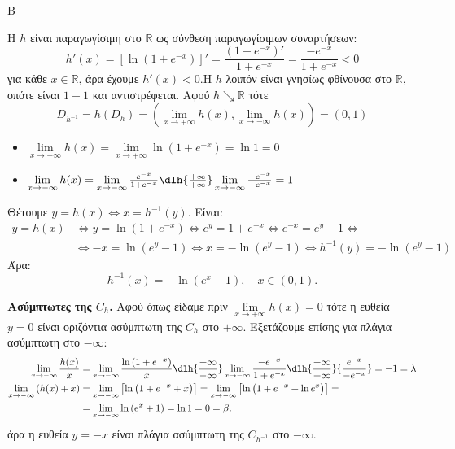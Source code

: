 \begin{thema}{Β}
\begin{erwthma}[resume]
\item Η $h$ είναι παραγωγίσιμη στο $\mathbb{R}$ ως σύνθεση παραγωγίσιμων συναρτήσεων:
\[
h'(x)=\left[\ln\left(1+e^{-x}\right)\right]'=\frac{\left(1+e^{-x}\right)'}{1+e^{-x}}=\frac{-e^{-x}}{1+e^{-x}}<0
\]
για κάθε $x\in\mathbb{R}$, άρα έχουμε $h'(x)<0$.Η $h$ λοιπόν είναι γνησίως φθίνουσα στο $\mathbb{R}$, οπότε είναι $1-1$ και αντιστρέφεται. Αφού $h\searrow\mathbb{R}$ τότε
\[D_{h^{-1}}=h(D_h)=\left(\lim\limits_{x\to+\infty}{h(x)},\lim\limits_{x\to -\infty}{h(x)}\right)=(0,1)\]
\begin{itemize}
\item $\lim\limits_{x\to+\infty}{h(x)}=\lim\limits_{x\to +\infty}{\ln\left(1+e^{-x}\right)}=\ln{1}=0$
\item $\lim\limits_{x\to -\infty}{h(x)}=\lim\limits_{x\to-\infty}{\frac{e^{-x}}{1+e^{-x}}}\dlh{\frac{+\infty}{+\infty}}\lim\limits_{x\to-\infty}{\frac{-e^{-x}}{-e^{-x}}}=1$
\end{itemize}
Θέτουμε $y=h(x)\Leftrightarrow x=h^{-1}(y)$. Είναι:
\begin{align*}
y=h(x)&\Leftrightarrow y=\ln\left(1+e^{-x}\right)\Leftrightarrow e^y=1+e^{-x}\Leftrightarrow e^{-x}=e^y-1\Leftrightarrow\\&\Leftrightarrow -x=\ln(e^y-1)\Leftrightarrow x=-\ln(e^y-1)\Leftrightarrow h^{-1}(y)=-\ln(e^y-1)
\end{align*}
Άρα:
\[
h^{-1}(x)=-\ln(e^x-1),\quad x\in(0,1).
\]

\item \textbf{Ασύμπτωτες της $C_{h}$.}
Αφού όπως είδαμε πριν $\lim\limits_{x\to +\infty}{h(x)}=0$ τότε η ευθεία $y=0$ είναι οριζόντια ασύμπτωτη της $C_h$ στο $+\infty$. Εξετάζουμε επίσης για πλάγια ασύμπτωτη στο $-\infty$:
\begin{align*}
\lim\limits_{x\to -\infty}{\frac{h(x)}{x}}&=\lim\limits_{x\to -\infty}{\frac{\ln\left(1+e^{-x}\right)}{x}}\dlh{\frac{+\infty}{-\infty}}\lim\limits_{x\to -\infty}{\frac{-e^{-x}}{1+e^{-x}}}\dlh{\frac{+\infty}{+\infty}}{\frac{e^{-x}}{-e^{-x}}}=-1=\lambda\\
\lim\limits_{x\to -\infty}{\left(h(x)+x\right)}&=\lim\limits_{x\to-\infty}{\left[\ln\left(1+e^{-x}+x\right)\right]}=\lim\limits_{x\to-\infty}{\left[\ln\left(1+e^{-x}+\ln{e^x}\right)\right]}=\\&=\lim\limits_{x\to-\infty}{\ln{\left(e^x+1\right)}}=\ln1=0=\beta.
\end{align*}
άρα η ευθεία $y=-x$ είναι πλάγια ασύμπτωτη της $C_{h^{-1}}$ στο $-\infty$.


\end{erwthma}
\end{thema}
